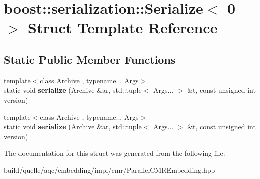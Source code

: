 \hypertarget{a00122}{}\section{boost\+:\+:serialization\+:\+:Serialize$<$ 0 $>$ Struct Template Reference}
\label{a00122}
\subsection*{Static Public Member Functions}
\begin{DoxyCompactItemize}
\item 
{\footnotesize template$<$class Archive , typename... Args$>$ }\\static void {\bfseries serialize} (Archive \&ar, std\+::tuple$<$ Args... $>$ \&t, const unsigned int version)\hypertarget{a00122_a6497293bc8a412a7f70d5f52066bd19d}{}\label{a00122_a6497293bc8a412a7f70d5f52066bd19d}

\item 
{\footnotesize template$<$class Archive , typename... Args$>$ }\\static void {\bfseries serialize} (Archive \&ar, std\+::tuple$<$ Args... $>$ \&t, const unsigned int version)\hypertarget{a00122_a6497293bc8a412a7f70d5f52066bd19d}{}\label{a00122_a6497293bc8a412a7f70d5f52066bd19d}

\end{DoxyCompactItemize}


The documentation for this struct was generated from the following file\+:\begin{DoxyCompactItemize}
\item 
build/quelle/aqc/embedding/impl/cmr/\+Parallel\+C\+M\+R\+Embedding.\+hpp\end{DoxyCompactItemize}
